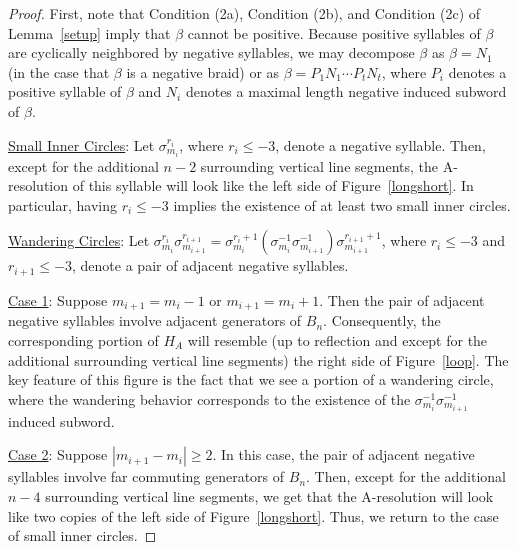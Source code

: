 \documentclass{article}
\begin{document}
\begin{proof} First, note that Condition (2a), Condition (2b), and Condition (2c) of Lemma~\ref{setup} imply that $\beta$ cannot be positive. Because positive syllables of $\beta$ are cyclically neighbored by negative syllables, we may decompose $\beta$ as $\beta=N_{1}$ (in the case that $\beta$ is a negative braid) or as $\beta=P_{1}N_{1} \cdots P_{t}N_{t}$, where $P_{i}$ denotes a positive syllable of $\beta$ and $N_{i}$ denotes a maximal length negative induced subword of $\beta$. 

\bigskip

\noindent \underline{Small Inner Circles}: Let $\sigma_{m_{i}}^{r_{i}}$, where $r_{i} \leq -3$, denote a negative syllable. Then, except for the additional $n-2$ surrounding vertical line segments, the A-resolution of this syllable will look like the left side of Figure~\ref{longshort}. In particular, having $r_{i} \leq -3$ implies the existence of at least two small inner circles. 

\bigskip

\noindent \underline{Wandering Circles}: Let $\sigma_{m_{i}}^{r_{i}}\sigma_{m_{i+1}}^{r_{i+1}}=\sigma_{{m_i}}^{r_{i}+1}(\sigma_{m_{i}}^{-1}\sigma_{m_{i+1}}^{-1})\sigma_{m_{i+1}}^{r_{i+1}+1}$, where $r_{i} \leq -3$ and $r_{i+1} \leq -3$, denote a pair of adjacent negative syllables.

\bigskip

\underline{Case 1}: Suppose $m_{i+1}=m_{i}-1$ or $m_{i+1}=m_{i}+1$. Then the pair of adjacent negative syllables involve adjacent generators of $B_{n}$. Consequently, the corresponding portion of $H_{A}$ will resemble (up to reflection and except for the additional surrounding vertical line segments) the right side of Figure~\ref{loop}. The key feature of this figure is the fact that we see a portion of a wandering circle, where the wandering behavior corresponds to the existence of the $\sigma_{m_{i}}^{-1}\sigma_{m_{i+1}}^{-1}$ induced subword. 

\bigskip

\underline{Case 2}: Suppose $\left|m_{i+1}-m_{i}\right| \geq 2$. In this case, the pair of adjacent negative syllables involve far commuting generators of $B_{n}$. Then, except for the additional $n-4$ surrounding vertical line segments, we get that the A-resolution will look like two copies of the left side of Figure~\ref{longshort}. Thus, we return to the case of small inner circles. 

\bigskip


\end{proof}
\end{document}
